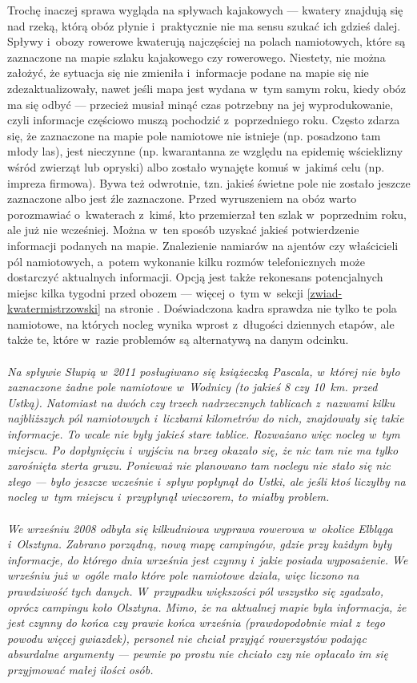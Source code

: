 \documentclass[a5paper,10pt,titlepage,twoside]{article}
\begin{document}
Trochę inaczej sprawa wygląda na spływach kajakowych --- kwatery znajdują się nad rzeką, którą obóz płynie i~praktycznie nie ma sensu szukać ich gdzieś dalej. Spływy i~obozy rowerowe kwaterują najczęściej na polach namiotowych, które są zaznaczone na mapie szlaku kajakowego czy rowerowego. Niestety, nie można założyć, że sytuacja się nie zmieniła i~informacje podane na mapie się nie zdezaktualizowały, nawet jeśli mapa jest wydana w~tym samym roku, kiedy obóz ma się odbyć --- przecież musiał minąć czas potrzebny na jej wyprodukowanie, czyli informacje częściowo muszą pochodzić z~poprzedniego roku. Często zdarza się, że zaznaczone na mapie pole namiotowe nie istnieje (np. posadzono tam młody las), jest nieczynne (np. kwarantanna ze względu na epidemię wścieklizny wśród zwierząt lub opryski) albo zostało wynajęte komuś w~jakimś celu (np. impreza firmowa). Bywa też odwrotnie, tzn. jakieś świetne pole nie zostało jeszcze zaznaczone albo jest źle zaznaczone. Przed wyruszeniem na obóz warto porozmawiać o~kwaterach z~kimś, kto przemierzał ten szlak w~poprzednim roku, ale już nie wcześniej. Można w~ten sposób uzyskać jakieś potwierdzenie informacji podanych na mapie. Znalezienie namiarów na ajentów czy właścicieli pól namiotowych, a~potem wykonanie kilku rozmów telefonicznych może dostarczyć aktualnych informacji. Opcją jest także rekonesans potencjalnych miejsc kilka tygodni przed obozem --- więcej o~tym w~sekcji \ref{zwiad-kwatermistrzowski} na stronie \pageref{zwiad-kwatermistrzowski}. Doświadczona kadra sprawdza nie tylko te pola namiotowe, na których nocleg wynika wprost z~długości dziennych etapów, ale także te, które w~razie problemów są alternatywą na danym odcinku.
\\
\\
\small{
\emph{Na spływie Słupią w~2011 posługiwano się książeczką Pascala, w~której nie było zaznaczone żadne pole namiotowe w~Wodnicy (to jakieś 8 czy 10~km. przed Ustką). Natomiast na dwóch czy trzech nadrzecznych tablicach z~nazwami kilku najbliższych pól namiotowych i~liczbami kilometrów do nich, znajdowały się takie informacje. To wcale nie były jakieś stare tablice. Rozważano więc nocleg w~tym miejscu. Po dopłynięciu i~wyjściu na brzeg okazało się, że nic tam nie ma tylko zarośnięta sterta gruzu. Ponieważ nie planowano tam noclegu nie stało się nic złego --- było jeszcze wcześnie i~spływ popłynął do Ustki, ale jeśli ktoś liczyłby na nocleg w~tym miejscu i~przypłynął wieczorem, to miałby problem.}}
\\
\\
\small{
\emph{We wrześniu 2008 odbyła się kilkudniowa wyprawa rowerowa w~okolice Elbląga i~Olsztyna. Zabrano porządną, nową mapę campingów, gdzie przy każdym były informacje, do którego dnia września jest czynny i~jakie posiada wyposażenie. We wrześniu już w~ogóle mało które pole namiotowe działa, więc liczono na prawdziwość tych danych. W~przypadku większości pól wszystko się zgadzało, oprócz campingu koło Olsztyna. Mimo, że na aktualnej mapie była informacja, że jest czynny do końca czy prawie końca września (prawdopodobnie miał z~tego powodu więcej gwiazdek), personel nie chciał przyjąć rowerzystów podając absurdalne argumenty --- pewnie po prostu nie chciało czy nie opłacało im się przyjmować małej ilości osób.}}
\end{document}
